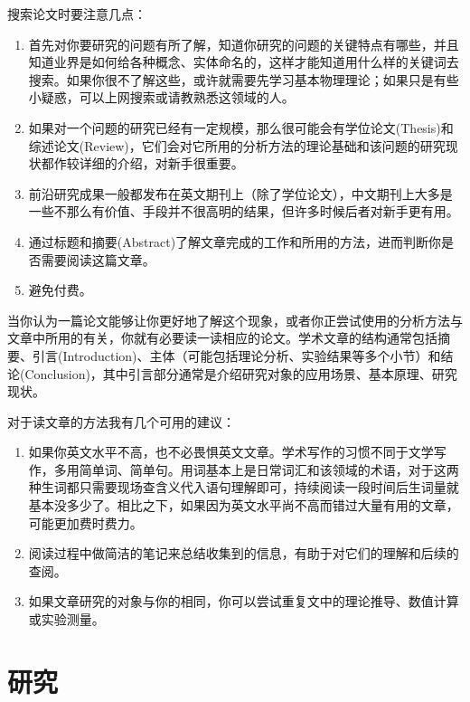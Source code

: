 \documentclass[a4paper,10pt,english]{sphinxmanual}
\begin{document}
搜索论文时要注意几点：
\begin{enumerate}
\item {} 
首先对你要研究的问题有所了解，知道你研究的问题的关键特点有哪些，并且知道业界是如何给各种概念、实体命名的，这样才能知道用什么样的关键词去搜索。如果你很不了解这些，或许就需要先学习基本物理理论；如果只是有些小疑惑，可以上网搜索或请教熟悉这领域的人。

\item {} 
如果对一个问题的研究已经有一定规模，那么很可能会有学位论文(Thesis)和综述论文(Review)，它们会对它所用的分析方法的理论基础和该问题的研究现状都作较详细的介绍，对新手很重要。

\item {} 
前沿研究成果一般都发布在英文期刊上（除了学位论文），中文期刊上大多是一些不那么有价值、手段并不很高明的结果，但许多时候后者对新手更有用。

\item {} 
通过标题和摘要(Abstract)了解文章完成的工作和所用的方法，进而判断你是否需要阅读这篇文章。

\item {} 
避免付费。

\end{enumerate}

当你认为一篇论文能够让你更好地了解这个现象，或者你正尝试使用的分析方法与文章中所用的有关，你就有必要读一读相应的论文。学术文章的结构通常包括摘要、引言(Introduction)、主体（可能包括理论分析、实验结果等多个小节）和结论(Conclusion)，其中引言部分通常是介绍研究对象的应用场景、基本原理、研究现状。

对于读文章的方法我有几个可用的建议：
\begin{enumerate}
\item {} 
如果你英文水平不高，也不必畏惧英文文章。学术写作的习惯不同于文学写作，多用简单词、简单句。用词基本上是日常词汇和该领域的术语，对于这两种生词都只需要现场查含义代入语句理解即可，持续阅读一段时间后生词量就基本没多少了。相比之下，如果因为英文水平尚不高而错过大量有用的文章，可能更加费时费力。

\item {} 
阅读过程中做简洁的笔记来总结收集到的信息，有助于对它们的理解和后续的查阅。

\item {} 
如果文章研究的对象与你的相同，你可以尝试重复文中的理论推导、数值计算或实验测量。

\end{enumerate}


\chapter{研究}
\label{\detokenize{5. Research::doc}}\label{\detokenize{5. Research:id1}}
\end{document}
